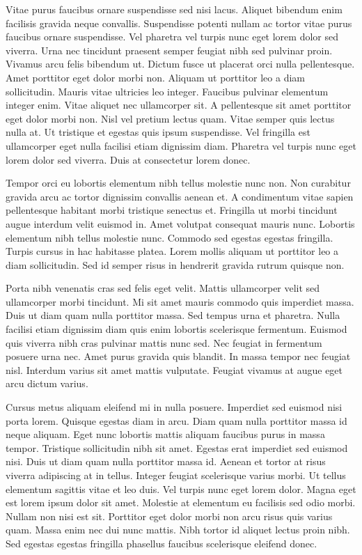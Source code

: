 Vitae purus faucibus ornare suspendisse sed nisi lacus. Aliquet 
bibendum enim facilisis gravida neque convallis. Suspendisse potenti 
nullam ac tortor vitae purus faucibus ornare suspendisse. Vel pharetra 
vel turpis nunc eget lorem dolor sed viverra. Urna nec tincidunt 
praesent semper feugiat nibh sed pulvinar proin. Vivamus arcu felis 
bibendum ut. Dictum fusce ut placerat orci nulla pellentesque. Amet 
porttitor eget dolor morbi non. Aliquam ut porttitor leo a diam 
sollicitudin. Mauris vitae ultricies leo integer. Faucibus pulvinar 
elementum integer enim. Vitae aliquet nec ullamcorper sit. A 
pellentesque sit amet porttitor eget dolor morbi non. Nisl vel pretium 
lectus quam. Vitae semper quis lectus nulla at. Ut tristique et egestas 
quis ipsum suspendisse. Vel fringilla est ullamcorper eget nulla 
facilisi etiam dignissim diam. Pharetra vel turpis nunc eget lorem dolor
 sed viverra. Duis at consectetur lorem donec.


Tempor orci eu lobortis elementum nibh tellus molestie nunc non. Non 
curabitur gravida arcu ac tortor dignissim convallis aenean et. A 
condimentum vitae sapien pellentesque habitant morbi tristique senectus 
et. Fringilla ut morbi tincidunt augue interdum velit euismod in. Amet 
volutpat consequat mauris nunc. Lobortis elementum nibh tellus molestie 
nunc. Commodo sed egestas egestas fringilla. Turpis cursus in hac 
habitasse platea. Lorem mollis aliquam ut porttitor leo a diam 
sollicitudin. Sed id semper risus in hendrerit gravida rutrum quisque 
non.


Porta nibh venenatis cras sed felis eget velit. Mattis ullamcorper 
velit sed ullamcorper morbi tincidunt. Mi sit amet mauris commodo quis 
imperdiet massa. Duis ut diam quam nulla porttitor massa. Sed tempus 
urna et pharetra. Nulla facilisi etiam dignissim diam quis enim lobortis
 scelerisque fermentum. Euismod quis viverra nibh cras pulvinar mattis 
nunc sed. Nec feugiat in fermentum posuere urna nec. Amet purus gravida 
quis blandit. In massa tempor nec feugiat nisl. Interdum varius sit amet
 mattis vulputate. Feugiat vivamus at augue eget arcu dictum varius.


Cursus metus aliquam eleifend mi in nulla posuere. Imperdiet sed 
euismod nisi porta lorem. Quisque egestas diam in arcu. Diam quam nulla 
porttitor massa id neque aliquam. Eget nunc lobortis mattis aliquam 
faucibus purus in massa tempor. Tristique sollicitudin nibh sit amet. 
Egestas erat imperdiet sed euismod nisi. Duis ut diam quam nulla 
porttitor massa id. Aenean et tortor at risus viverra adipiscing at in 
tellus. Integer feugiat scelerisque varius morbi. Ut tellus elementum 
sagittis vitae et leo duis. Vel turpis nunc eget lorem dolor. Magna eget
 est lorem ipsum dolor sit amet. Molestie at elementum eu facilisis sed 
odio morbi. Nullam non nisi est sit. Porttitor eget dolor morbi non arcu
 risus quis varius quam. Massa enim nec dui nunc mattis. Nibh tortor id 
aliquet lectus proin nibh. Sed egestas egestas fringilla phasellus 
faucibus scelerisque eleifend donec.



